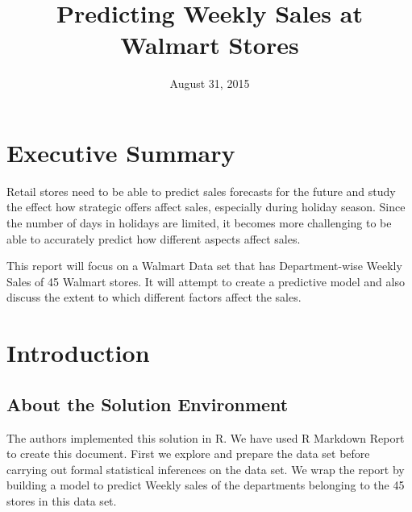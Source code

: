 \documentclass[]{article}
\title{Predicting Weekly Sales at Walmart Stores}
\author{}
\date{August 31, 2015}
\begin{document}
\maketitle


{
\hypersetup{linkcolor=black}
\setcounter{tocdepth}{3}
\tableofcontents
}
\pagebreak
\hfill \break
\hfill \break
\hfill \break
\hfill \break
\hfill \break
\hfill \break
\hfill \break
\hfill \break
\hfill \break
\hfill \break
\hfill \break
\hfill \break
\hfill \break
\hfill \break
\hfill \break
\hfill \break
\hfill \break
\hfill \break
\hfill \break
\hfill \break

\section{Executive Summary}\label{executive-summary}

Retail stores need to be able to predict sales forecasts for the future
and study the effect how strategic offers affect sales, especially
during holiday season. Since the number of days in holidays are limited,
it becomes more challenging to be able to accurately predict how
different aspects affect sales.

This report will focus on a Walmart Data set that has Department-wise
Weekly Sales of 45 Walmart stores. It will attempt to create a
predictive model and also discuss the extent to which different factors
affect the sales.

\pagebreak
\hfill \break
\hfill \break
\hfill \break
\hfill \break
\hfill \break
\hfill \break
\hfill \break
\hfill \break
\hfill \break
\hfill \break
\hfill \break
\hfill \break
\hfill \break
\hfill \break
\hfill \break
\hfill \break
\hfill \break
\hfill \break
\hfill \break
\hfill \break
\graphicspath{ {Images/} }

\section{Introduction}\label{introduction}

\subsection{About the Solution
Environment}\label{about-the-solution-environment}

The authors implemented this solution in R. We have used R Markdown
Report to create this document. First we explore and prepare the data
set before carrying out formal statistical inferences on the data set.
We wrap the report by building a model to predict Weekly sales of the
departments belonging to the 45 stores in this data set.
\end{document}
